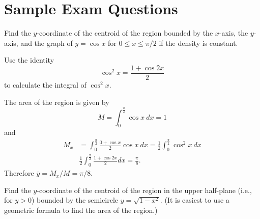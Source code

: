 \documentclass{ximera}
\begin{document}
\section*{Sample Exam Questions}




\begin{question}%

Find the \(y\)-coordinate of the centroid of the region bounded by the \(x\)-axis, the \(y\)-axis, and the graph of \(y = \cos x\) for \(0 \leq x \leq \pi/2\) if the density is constant.
\begin{hint}
Use the identity \[ \cos^2 x  = \frac{1 + \cos 2x}{2} \]
to calculate the integral of $\cos^2 x$.
\end{hint}
\begin{multiplechoice}
\end{multiplechoice}
\begin{feedback}
The area of the region is given by
\[ M = \int_0^{\frac{\pi}{2}} \cos x~dx = 1 \]
and 
\[\begin{aligned}
 M_x & = \int_0^{\frac{\pi}{2}} \frac{0 + \cos x}{2} \cos x~ dx = \frac{1}{2} \int_0^{\frac{\pi}{2}} \cos^2 x ~ dx \\
& \frac{1}{2} \int_0^{\frac{\pi}{2}} \frac{1 + \cos 2x}{2} dx = \frac{\pi}{8}. 
\end{aligned}\]
Therefore \(\overline{y} = M_x / M = \pi/8\).
\end{feedback}

\end{question}

\begin{question}%

Find the \(y\)-coordinate of the centroid of the region in the upper half-plane (i.e., for \(y > 0\)) bounded by the semicircle \(y = \sqrt{1-x^2}\). (It is easiest to use a geometric formula to find the area of the region.)
\begin{multiplechoice}
\end{multiplechoice}

\end{question}
\end{document}
